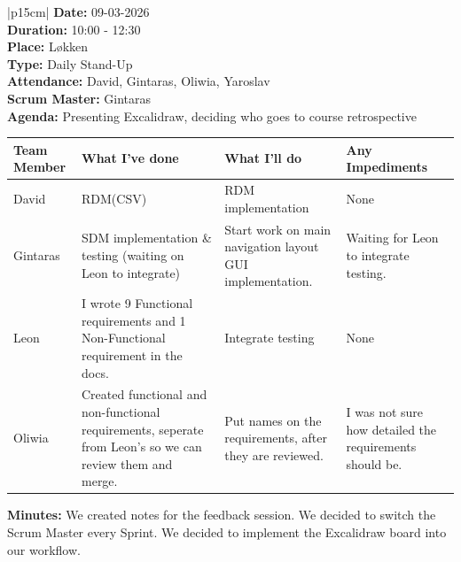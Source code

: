 \begin{table}[H]
    \centering
    \begin{tabular}{|p{15cm}|}   
        \hline
        \textbf{Date:}  09-03-2026 \\
        \textbf{Duration:}  10:00 - 12:30 \\
        \textbf{Place:}  Løkken \\
        \textbf{Type:}  Daily Stand-Up \\
        \textbf{Attendance:}  David, Gintaras, Oliwia, Yaroslav \\
        \textbf{Scrum Master:}  Gintaras \\
        \textbf{Agenda:}  Presenting Excalidraw, deciding who goes to course retrospective
        \begin{table}[H]
            \begin{tabular}{|p{1.75cm}|p{4cm}|p{4cm}|p{4cm}|}
                \hline
                \cellcolor[HTML]{BFBFBF}  \textbf{Team Member} & \cellcolor[HTML]{BFBFBF}  \textbf{What I've done} & \cellcolor[HTML]{BFBFBF}  \textbf{What I'll do} & \cellcolor[HTML]{BFBFBF}  \textbf{Any Impediments}\\
                \hline
                \cellcolor[HTML]{d4d4d4} David & RDM(CSV) & RDM implementation & None \\
                \hline
                \cellcolor[HTML]{d4d4d4} Gintaras & SDM implementation \& testing (waiting on Leon to integrate) & Start work on main navigation layout GUI implementation. & Waiting for Leon to integrate testing. \\
                \hline
                \cellcolor[HTML]{d4d4d4} Leon & I wrote 9 Functional requirements and 1 Non-Functional requirement in the docs. & Integrate testing & None \\
                \hline
                \cellcolor[HTML]{d4d4d4} Oliwia & Created functional and non-functional requirements, seperate from Leon's so we can review them and merge. & Put names on the requirements, after they are reviewed. & I was not sure how detailed the requirements should be. \\
                \hline
            \end{tabular}
        \end{table}
        \textbf{Minutes:}  We created notes for the feedback session. We decided to switch the Scrum Master every Sprint.  We decided to implement the Excalidraw board into our workflow. \\
        \hline
    \end{tabular}
\end{table}

